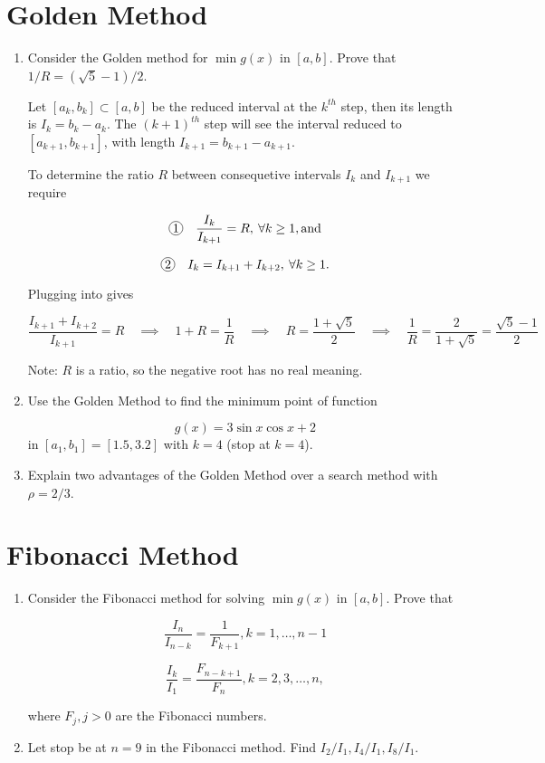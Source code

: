 \documentclass[11pt,oneside]{extarticle}
\newcommand*\circled[1]{\tikz[baseline=(char.base)]{
    \node[shape=circle,draw,inner sep=1pt] (char) {#1};}}
\begin{document}
\section{Golden Method}

\begin{enumerate}
    
    \item Consider the Golden method for $\min g(x)$ in $[a,b]$. Prove that
        $1/R = (\sqrt{5} - 1) / 2$.

        Let $[a_k,b_k] \subset [a,b]$ be the reduced interval at the $k^{th}$ step,
        then its length is $I_k = b_k - a_k$. The $(k+1)^{th}$ step will see the
        interval reduced to $[a_{k+1},b_{k+1}]$, with length $I_{k+1}=b_{k+1}-a_{k+1}$.

        To determine the ratio $R$ between consequetive intervals $I_k$ and
        $I_{k+1}$ we require

        $$\circled{1}\quad \frac{I_k}{I_{k+1}} = R,\:\forall k \geq 1, \mathrm{and}$$

        $$\circled{2}\quad I_k = I_{k+1}+I_{k+2},\: \forall k \geq  1.$$

        Plugging \circled{2} into \circled{1} gives

        $$
        \frac{I_{k+1}+I_{k+2}}{I_{k+1}} = R
        \quad\implies\quad
        1+R=\frac{1}{R}
        \quad\implies\quad
        R = \frac{1+\sqrt{5}}{2}
        \quad\implies\quad
        \frac{1}{R}=
        \frac{2}{1+\sqrt{5}}=
        \frac{\sqrt{5}-1}{2}
        $$

        Note: $R$ is a ratio, so the negative root has no real meaning.


    \item Use the Golden Method to find the minimum point of function

        $$g(x) = 3\sin x\cos x + 2$$
        in $[a_1,b_1]=[1.5,3.2]$ with $k=4$ (stop at $k=4$).


    \item Explain two advantages of the Golden Method over a search method
        with $\rho=2/3$.

\end{enumerate}

\section{Fibonacci Method}

\begin{enumerate}

    \item Consider the Fibonacci method for solving $\min g(x)$ in $[a,b]$.
        Prove that

        $$\frac{I_n}{I_{n-k}}=\frac{1}{F_{k+1}}, k=1,\ldots,n-1$$

        $$\frac{I_k}{I_1}=\frac{F_{n-k+1}}{F_n}, k=2,3,\ldots,n,$$

        where $F_j,j>0$ are the Fibonacci numbers.

    \item Let stop be at $n=9$ in the Fibonacci method. Find $I_2/I_1,I_4/I_1,
        I_8/I_1$.

\end{enumerate}
\end{document}
